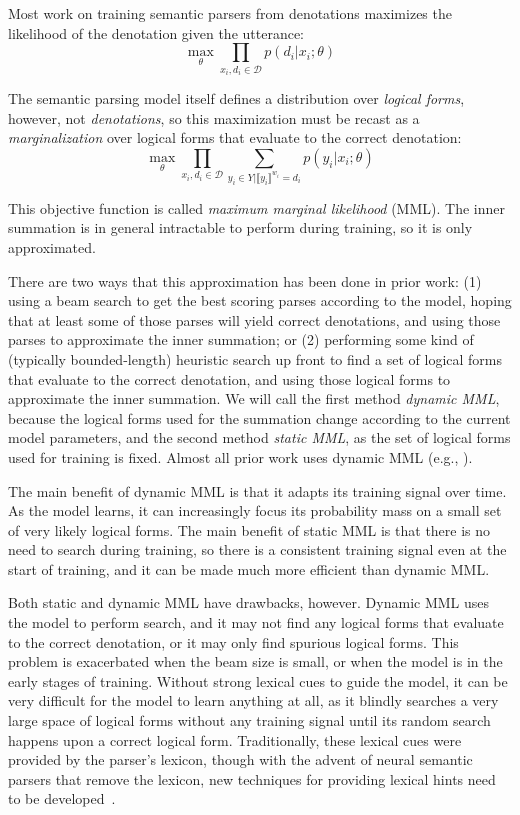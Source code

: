 Most work on training semantic parsers from denotations maximizes the
likelihood of the denotation given the utterance: \begin{equation} \max_\theta
\prod_{x_i,d_i \in \mathcal{D}} p(d_i|x_i; \theta) \end{equation}

\noindent The semantic parsing model itself defines a distribution over
\emph{logical forms}, however, not \emph{denotations}, so this maximization
must be recast as a \emph{marginalization} over logical forms that evaluate to
the correct denotation: \begin{equation} \max_\theta \prod_{x_i,d_i \in
\mathcal{D}} \sum_{y_i \in Y | \llbracket y_i \rrbracket^{w_i} = d_i} p(y_i |
x_i; \theta) \end{equation}

\noindent This objective function is called \emph{maximum marginal likelihood}
(MML).  The inner summation is in general intractable to perform during
training, so it is only approximated.

There are two ways that this approximation has been done in prior work: (1)
using a beam search to get the best scoring parses according to the model,
hoping that at least some of those parses will yield correct denotations, and
using those parses to approximate the inner summation; or (2) performing some
kind of (typically bounded-length) heuristic search up front to find a set of
logical forms that evaluate to the correct denotation, and using those logical
forms to approximate the inner summation.  We will call the first method
\emph{dynamic MML}, because the logical forms used for the summation change
according to the current model parameters, and the second method \emph{static
MML}, as the set of logical forms used for training is fixed.  Almost all prior
work uses dynamic MML (e.g.,
\citet{liang2011learning,berant2013semantic,goldman2017weakly}).

The main benefit of dynamic MML is that it adapts its training signal over
time.  As the model learns, it can increasingly focus its probability mass on a
small set of very likely logical forms.  The main benefit of static MML is that
there is no need to search during training, so there is a consistent training
signal even at the start of training, and it can be made much more efficient
than dynamic MML.

Both static and dynamic MML have drawbacks, however.  Dynamic MML uses the
model to perform search, and it may not find any logical forms that evaluate to
the correct denotation, or it may only find spurious logical forms.  This
problem is exacerbated when the beam size is small, or when the model is in the
early stages of training.  Without strong lexical cues to guide the model, it
can be very difficult for the model to learn anything at all, as it blindly
searches a very large space of logical forms without any training signal until
its random search happens upon a correct logical form.  Traditionally, these
lexical cues were provided by the parser's lexicon, though with the advent of
neural semantic parsers that remove the lexicon, new techniques for providing
lexical hints need to be developed~\cite{goldman2017weakly}.

